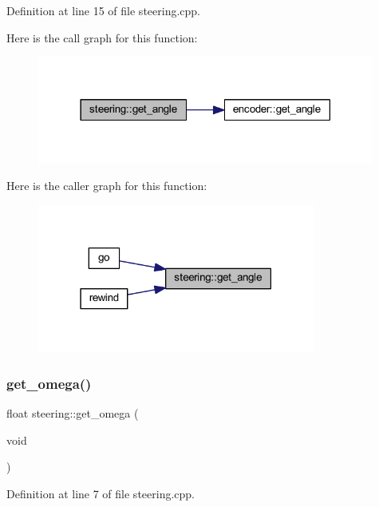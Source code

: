 Definition at line 15 of file steering.\+cpp.

Here is the call graph for this function\+:
\nopagebreak
\begin{figure}[H]
\begin{center}
\leavevmode
\includegraphics[width=314pt]{classsteering_aa2e30069b2a7d5ec7c4d8eeb0e30da32_cgraph}
\end{center}
\end{figure}
Here is the caller graph for this function\+:
\nopagebreak
\begin{figure}[H]
\begin{center}
\leavevmode
\includegraphics[width=259pt]{classsteering_aa2e30069b2a7d5ec7c4d8eeb0e30da32_icgraph}
\end{center}
\end{figure}
\mbox{\label{classsteering_a925978d3d3c42042b56d52a2dc049371}} 
\subsubsection{\texorpdfstring{get\_omega()}{get\_omega()}}
{\footnotesize\ttfamily float steering\+::get\+\_\+omega (\begin{DoxyParamCaption}\item[{void}]{ }\end{DoxyParamCaption})}



Definition at line 7 of file steering.\+cpp.

